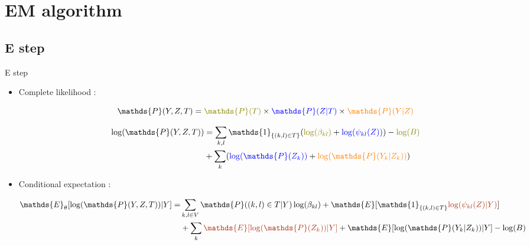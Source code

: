 \documentclass[9pt]{beamer}
\newcommand{\emphase}[1]{\textcolor{Complement}{#1}}
\begin{document}



\section{EM algorithm}
\subsection{E step}

\begin{frame}{E step}

\begin{itemize}
    \item Complete likelihood :

 \[ \mathds{P}(Y,Z,T) = \color{olive}\mathds{P}(T)\color{black}\times\color{blue}\mathds{P}(Z|T)\color{black}\times\color{orange}\mathds{P}(Y|Z)\]
 
\begin{align*}
 \log(\mathds{P}(Y,Z,T)) &= \sum_{k,l} \mathds{1}_{\{(k,l) \in T\}} (\color{olive}\log(\beta_{kl})\color{black} + \color{blue}\log(\psi_{kl}(Z)) \color{black})-\color{olive}\log(B)\color{black} \\
 &+\sum_k (\color{blue} \log(\mathds{P}(Z_k))\color{black} + \color{orange}\log(\mathds{P}(Y_k|Z_k))\color{black})
 \end{align*}
 
 \pause
 \item Conditional expectation :

\begin{align*}
    \mathds{E}_\theta[\log(\mathds{P}(Y,Z,T))|Y] =&\sum_{k,l\in V} \mathds{P}((k,l) \in T|Y) \log(\beta_{kl}) + \mathds{E}[\mathds{1}_{\{(k,l) \in T\}}\emphase{\log(\psi_{kl}(Z)|Y)}]\\
& +\sum_k \emphase{\mathds{E}[\log(\mathds{P}(Z_k)) | Y]} + \mathds{E}[\log(\mathds{P}(Y_k|Z_k)) | Y]-\log(B)
\end{align*} 
\end{itemize}
\end{frame}
\end{document}

